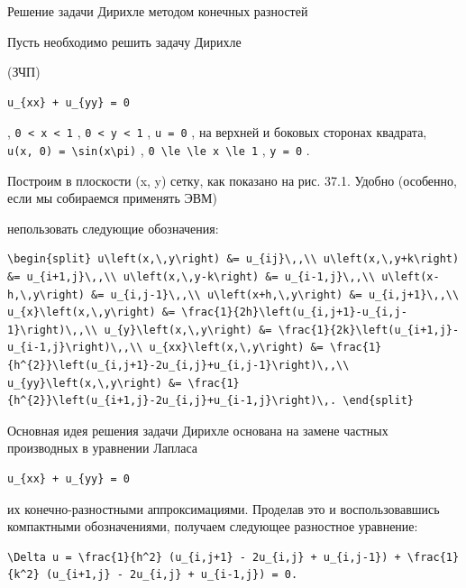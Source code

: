 \documentclass[
  ukrainian,
]{article}
\begin{document}
Решение задачи Дирихле методом конечных разностей

Пусть необходимо решить задачу Дирихле

(ЗЧП)

\begin{verbatim}
u_{xx} + u_{yy} = 0
\end{verbatim}

, \texttt{0\ \textless{}\ x\ \textless{}\ 1} ,
\texttt{0\ \textless{}\ y\ \textless{}\ 1} , \texttt{u\ =\ 0} , на
верхней и боковых сторонах квадрата,
\texttt{u(x,\ 0)\ =\ \textbackslash{}sin(x\textbackslash{}pi)} ,
\texttt{0\ \textbackslash{}le\ \textbackslash{}le\ x\ \textbackslash{}le\ 1}
, \texttt{y\ =\ 0} .

Построим в плоскости (x, y) сетку, как показано на рис. 37.1. Удобно
(особенно, если мы собираемся применять ЭВМ)

непользовать следующие обозначения:

\begin{verbatim}
\begin{split} u\left(x,\,y\right) &= u_{ij}\,,\\ u\left(x,\,y+k\right) &= u_{i+1,j}\,,\\ u\left(x,\,y-k\right) &= u_{i-1,j}\,,\\ u\left(x-h,\,y\right) &= u_{i,j-1}\,,\\ u\left(x+h,\,y\right) &= u_{i,j+1}\,,\\ u_{x}\left(x,\,y\right) &= \frac{1}{2h}\left(u_{i,j+1}-u_{i,j-1}\right)\,,\\ u_{y}\left(x,\,y\right) &= \frac{1}{2k}\left(u_{i+1,j}-u_{i-1,j}\right)\,,\\ u_{xx}\left(x,\,y\right) &= \frac{1}{h^{2}}\left(u_{i,j+1}-2u_{i,j}+u_{i,j-1}\right)\,,\\ u_{yy}\left(x,\,y\right) &= \frac{1}{h^{2}}\left(u_{i+1,j}-2u_{i,j}+u_{i-1,j}\right)\,. \end{split}
\end{verbatim}

Основная идея решения задачи Дирихле основана на замене частных
производных в уравнении Лапласа

\begin{verbatim}
u_{xx} + u_{yy} = 0
\end{verbatim}

их конечно-разностными аппроксимациями. Проделав это и воспользовавшись
компактными обозначениями, получаем следующее разностное уравнение:

\begin{verbatim}
\Delta u = \frac{1}{h^2} (u_{i,j+1} - 2u_{i,j} + u_{i,j-1}) + \frac{1}{k^2} (u_{i+1,j} - 2u_{i,j} + u_{i-1,j}) = 0.
\end{verbatim}
\end{document}
